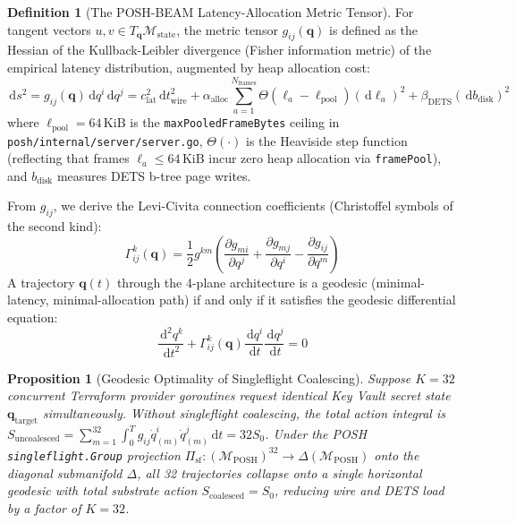 \documentclass[10pt,twoside,openany]{book}
\theoremstyle{plain}
\newtheorem{proposition}[theorem]{Proposition}
\theoremstyle{definition}
\newtheorem{definition}[theorem]{Definition}
\theoremstyle{remark}
\newcommand{\Man}{\mathcal{M}}
\newcommand{\dd}{\,\mathrm{d}}
\begin{document}
\begin{definition}[The POSH-BEAM Latency-Allocation Metric Tensor]
For tangent vectors $u, v \in T_{\mathbf{q}}\Man_{\mathrm{state}}$, the metric tensor $g_{ij}(\mathbf{q})$ is defined as the Hessian of the Kullback-Leibler divergence (Fisher information metric) of the empirical latency distribution, augmented by heap allocation cost:
\begin{equation}
\dd s^2 = g_{ij}(\mathbf{q})\dd q^i \dd q^j = c_{\mathrm{lat}}^2 \dd t_{\mathrm{wire}}^2 + \alpha_{\mathrm{alloc}} \sum_{a=1}^{N_{\mathrm{frames}}} \Theta\!\left(\ell_a - \ell_{\mathrm{pool}}\right) (\dd \ell_a)^2 + \beta_{\mathrm{DETS}} (\dd b_{\mathrm{disk}})^2
\end{equation}
where $\ell_{\mathrm{pool}} = 64\,\mathrm{KiB}$ is the \texttt{maxPooledFrameBytes} ceiling in \texttt{posh/internal/server/server.go}, $\Theta(\cdot)$ is the Heaviside step function (reflecting that frames $\ell_a \le 64\,\mathrm{KiB}$ incur zero heap allocation via \texttt{framePool}), and $b_{\mathrm{disk}}$ measures DETS b-tree page writes.
\end{definition}

From $g_{ij}$, we derive the Levi-Civita connection coefficients (Christoffel symbols of the second kind):
\begin{equation}
\Gamma^k_{ij}(\mathbf{q}) = \frac{1}{2} g^{km} \left( \frac{\partial g_{mi}}{\partial q^j} + \frac{\partial g_{mj}}{\partial q^i} - \frac{\partial g_{ij}}{\partial q^m} \right)
\end{equation}
A trajectory $\mathbf{q}(t)$ through the 4-plane architecture is a geodesic (minimal-latency, minimal-allocation path) if and only if it satisfies the geodesic differential equation:
\begin{equation}
\frac{\dd^2 q^k}{\dd t^2} + \Gamma^k_{ij}(\mathbf{q}) \frac{\dd q^i}{\dd t} \frac{\dd q^j}{\dd t} = 0
\end{equation}

\begin{proposition}[Geodesic Optimality of Singleflight Coalescing]
Suppose $K = 32$ concurrent Terraform provider goroutines request identical Key Vault secret state $\mathbf{q}_{\mathrm{target}}$ simultaneously. Without singleflight coalescing, the total action integral is $S_{\mathrm{uncoalesced}} = \sum_{m=1}^{32} \int_0^T g_{ij} \dot{q}_{(m)}^i \dot{q}_{(m)}^j \dd t = 32 S_0$. Under the POSH \texttt{singleflight.Group} projection $\Pi_{\mathrm{sf}}: (\Man_{\mathrm{POSH}})^{32} \to \Delta(\Man_{\mathrm{POSH}})$ onto the diagonal submanifold $\Delta$, all 32 trajectories collapse onto a single horizontal geodesic with total substrate action $S_{\mathrm{coalesced}} = S_0$, reducing wire and DETS load by a factor of $K = 32$.
\end{proposition}
\end{document}
